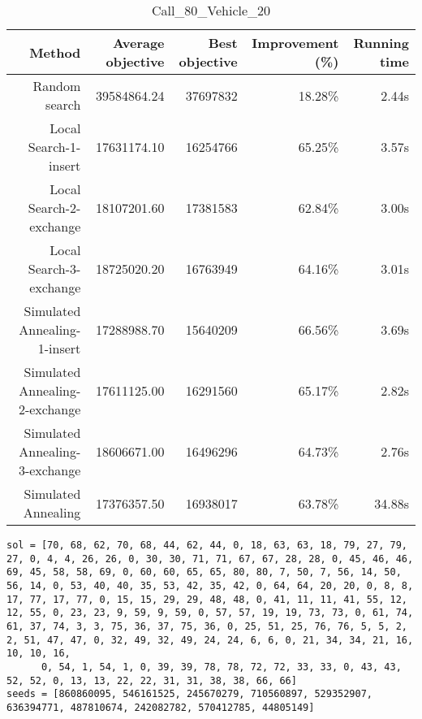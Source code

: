 \begin{table}[ht]
\centering
\caption{Call\_80\_Vehicle\_20}
\label{tab:call80vehicle20}
\begin{tabular}{|r|r|r|r|r|}
Method & Average objective & Best objective & Improvement (\%) & Running time \\
\hline
Random search & 39584864.24 & 37697832 & 18.28\% & 2.44s\\
Local Search-1-insert & 17631174.10 & 16254766 & 65.25\% & 3.57s\\
Local Search-2-exchange & 18107201.60 & 17381583 & 62.84\% & 3.00s\\
Local Search-3-exchange & 18725020.20 & 16763949 & 64.16\% & 3.01s\\
Simulated Annealing-1-insert & 17288988.70 & 15640209 & 66.56\% & 3.69s\\
Simulated Annealing-2-exchange & 17611125.00 & 16291560 & 65.17\% & 2.82s\\
Simulated Annealing-3-exchange & 18606671.00 & 16496296 & 64.73\% & 2.76s\\
Simulated Annealing & 17376357.50 & 16938017 & 63.78\% & 34.88s\\
\end{tabular}%
\end{table}
\begin{lstlisting}[label={lst:call80vehicle20},caption=Optimal solution call\_80\_vehicle\_20]
sol = [70, 68, 62, 70, 68, 44, 62, 44, 0, 18, 63, 63, 18, 79, 27, 79, 27, 0, 4, 4, 26, 26, 0, 30, 30, 71, 71, 67, 67, 28, 28, 0, 45, 46, 46, 69, 45, 58, 58, 69, 0, 60, 60, 65, 65, 80, 80, 7, 50, 7, 56, 14, 50, 56, 14, 0, 53, 40, 40, 35, 53, 42, 35, 42, 0, 64, 64, 20, 20, 0, 8, 8, 17, 77, 17, 77, 0, 15, 15, 29, 29, 48, 48, 0, 41, 11, 11, 41, 55, 12, 12, 55, 0, 23, 23, 9, 59, 9, 59, 0, 57, 57, 19, 19, 73, 73, 0, 61, 74, 61, 37, 74, 3, 3, 75, 36, 37, 75, 36, 0, 25, 51, 25, 76, 76, 5, 5, 2, 2, 51, 47, 47, 0, 32, 49, 32, 49, 24, 24, 6, 6, 0, 21, 34, 34, 21, 16, 10, 10, 16,
      0, 54, 1, 54, 1, 0, 39, 39, 78, 78, 72, 72, 33, 33, 0, 43, 43, 52, 52, 0, 13, 13, 22, 22, 31, 31, 38, 38, 66, 66]
seeds = [860860095, 546161525, 245670279, 710560897, 529352907, 636394771, 487810674, 242082782, 570412785, 44805149]
\end{lstlisting}%
\clearpage


